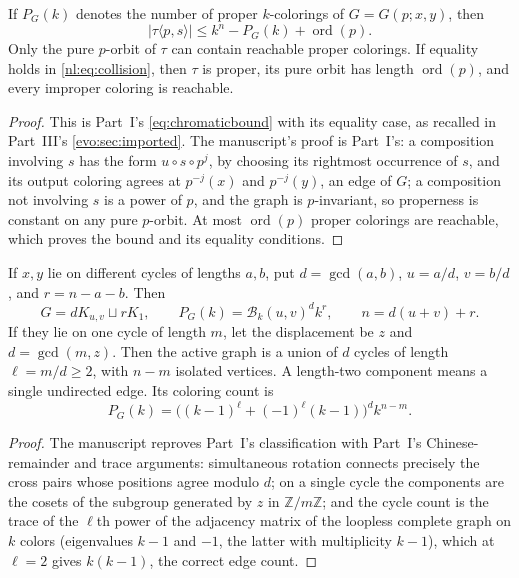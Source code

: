 \documentclass[11pt,a4paper]{article}
\numberwithin{equation}{section}
\theoremstyle{definition}
\theoremstyle{remark}
\newcommand{\Z}{\mathbb Z}
\newcommand{\ord}{\operatorname{ord}}
\newcommand{\Bip}{\mathcal B}
\begin{document}
\begin{lemma}\label{nl:lem:collision}
If $P_G(k)$ denotes the number of proper $k$-colorings of $G=G(p;x,y)$, then
\begin{equation}\label{nl:eq:collision}
 |\tau\langle p,s\rangle|\le k^n-P_G(k)+\ord(p).
\end{equation}
Only the pure $p$-orbit of $\tau$ can contain reachable proper colorings.
If equality holds in \eqref{nl:eq:collision}, then $\tau$ is proper, its pure
orbit has length $\ord(p)$, and every improper coloring is reachable.
\end{lemma}
\begin{proof}
This is Part~I's \eqref{eq:chromaticbound} with its equality case, as
recalled in Part~III's \cref{evo:sec:imported}. The manuscript's proof is
Part~I's: a composition involving $s$ has the form $u\circ s\circ p^j$, by
choosing its rightmost occurrence of $s$, and its output coloring agrees at
$p^{-j}(x)$ and $p^{-j}(y)$, an edge of $G$; a composition not involving $s$
is a power of $p$, and the graph is $p$-invariant, so properness is
constant on any pure $p$-orbit. At most $\ord(p)$ proper colorings are
reachable, which proves the bound and its equality conditions.
\end{proof}

\begin{lemma}\label{nl:lem:classify}
If $x,y$ lie on different cycles of lengths $a,b$, put
$d=\gcd(a,b)$, $u=a/d$, $v=b/d$, and $r=n-a-b$. Then
\begin{equation}\label{nl:eq:cross}
 G=dK_{u,v}\sqcup rK_1,\qquad
 P_G(k)=\Bip_k(u,v)^d k^r,
 \qquad n=d(u+v)+r.
\end{equation}
If they lie on one cycle of length $m$, let the displacement be $z$ and
$d=\gcd(m,z)$. Then the active graph is a union of $d$ cycles of length
$\ell=m/d\ge2$, with $n-m$ isolated vertices. A length-two component means
a single undirected edge. Its coloring count is
\begin{equation}\label{nl:eq:same}
 P_G(k)=\bigl((k-1)^\ell+(-1)^\ell(k-1)\bigr)^d k^{n-m}.
\end{equation}
\end{lemma}
\begin{proof}
The manuscript reproves Part~I's classification with Part~I's
Chinese-remainder and trace arguments: simultaneous rotation connects
precisely the cross pairs whose positions agree modulo $d$; on a single
cycle the components are the cosets of the subgroup generated by $z$ in
$\Z/m\Z$; and the cycle count is the trace of the $\ell$th power of the
adjacency matrix of the loopless complete graph on $k$ colors (eigenvalues
$k-1$ and $-1$, the latter with multiplicity $k-1$), which at $\ell=2$
gives $k(k-1)$, the correct edge count.
\end{proof}
\end{document}
